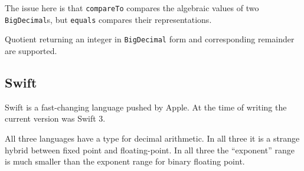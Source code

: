 \documentclass{article}
\begin{document}
The issue here is that {\tt compareTo} compares the algebraic
values of two {\tt BigDecimal}s, but {\tt equals} compares
their representations.

Quotient returning an integer in {\tt BigDecimal} form and
corresponding remainder are supported.



\subsection{Swift}


Swift is a fast-changing language pushed by Apple.
At the time of writing the current version was Swift 3.

All three languages have a type for decimal arithmetic.
In all three it is a strange hybrid between fixed point
and floating-point.  In all three the ``exponent'' range is
much smaller than the exponent range for binary floating point.
\end{document}
